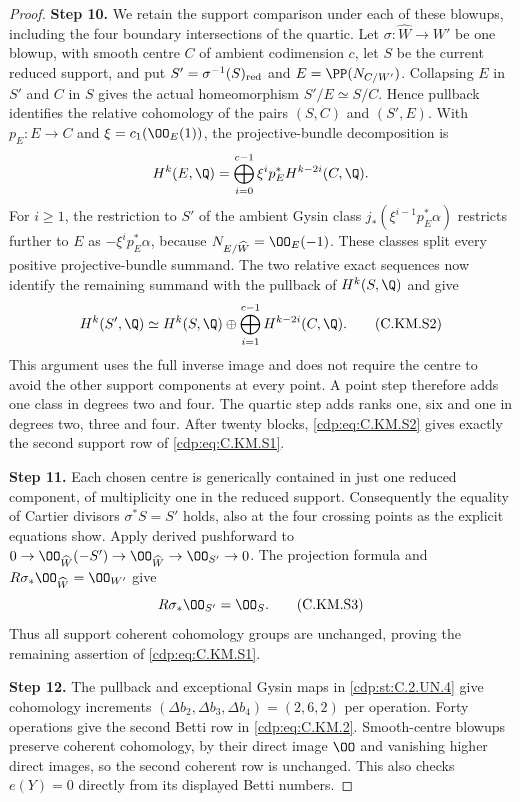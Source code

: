 \begin{proof}
\noindent\textbf{Step 10.} We retain the support comparison under each of these blowups,
including the four boundary intersections of the quartic.
Let $\sigma:\widehat W\to W'$ be one blowup, with smooth
centre $C$ of ambient codimension $c$, let $S$ be the current
reduced support, and put $S'=\sigma^{-1}(S)_{\rm red}$ and
$E=\PP(N_{C/W'})$. Collapsing $E$ in $S'$ and $C$ in $S$
gives the actual homeomorphism $S'/E\simeq S/C$.
Hence pullback identifies the relative cohomology of the
pairs $(S,C)$ and $(S',E)$. With $p_E:E\to C$ and
$\xi=c_1(\OO_E(1))$, the projective-bundle decomposition is
\[
 H^k(E,\Q)=\bigoplus_{i=0}^{c-1}
                \xi^i p_E^*H^{k-2i}(C,\Q).
\]
For $i\ge1$, the restriction to $S'$ of the ambient Gysin
class $j_*(\xi^{i-1}p_E^*\alpha)$ restricts further to $E$
as $-\xi^i p_E^*\alpha$, because $N_{E/\widehat W}=\OO_E(-1)$.
These classes split every positive projective-bundle summand.
The two relative exact sequences now identify the remaining
summand with the pullback of $H^k(S,\Q)$ and give
\[
 H^k(S',\Q)\simeq H^k(S,\Q)\oplus
                \bigoplus_{i=1}^{c-1}H^{k-2i}(C,\Q).
                                                        \tag{C.KM.S2}\label{cdp:eq:C.KM.S2}
\]
This argument uses the full inverse image and does not require
the centre to avoid the other support components at every point.
A point step therefore adds one class in degrees two and four.
The quartic step adds ranks one, six and one in degrees two,
three and four. After twenty blocks, \eqref{cdp:eq:C.KM.S2} gives exactly
the second support row of \eqref{cdp:eq:C.KM.S1}.

\noindent\textbf{Step 11.} Each chosen centre is generically contained in just one
reduced component, of multiplicity one in the reduced support.
Consequently the equality of Cartier divisors
$\sigma^*S=S'$ holds, also at the four crossing points as
the explicit equations show. Apply derived pushforward to
$0\to\OO_{\widehat W}(-S')\to\OO_{\widehat W}\to
\OO_{S'}\to0$. The projection formula and
$R\sigma_*\OO_{\widehat W}=\OO_{W'}$ give
\[
                         R\sigma_*\OO_{S'}=\OO_S.       \tag{C.KM.S3}\label{cdp:eq:C.KM.S3}
\]
Thus all support coherent cohomology groups are unchanged,
proving the remaining assertion of \eqref{cdp:eq:C.KM.S1}.

\noindent\textbf{Step 12.} The pullback and exceptional Gysin maps in \ref{cdp:st:C.2.UN.4}
give cohomology increments $(\Delta b_2,\Delta b_3,
\Delta b_4)=(2,6,2)$ per operation. Forty operations
give the second Betti row in \eqref{cdp:eq:C.KM.2}. Smooth-centre
blowups preserve coherent cohomology, by their direct
image $\OO$ and vanishing higher direct images, so
the second coherent row is unchanged. This also checks
$e(Y)=0$ directly from its displayed Betti numbers.


\end{proof}
